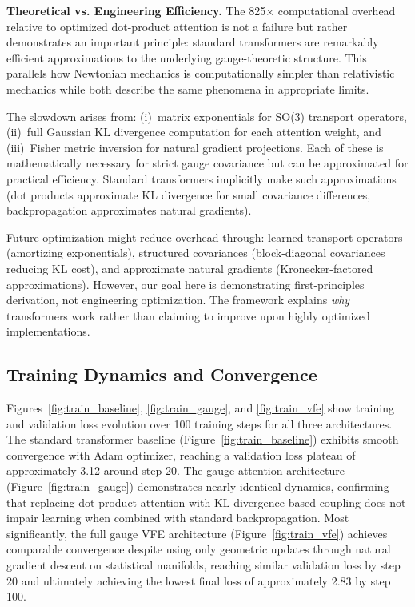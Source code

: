 \documentclass[11pt]{article}
\begin{document}
\textbf{Theoretical vs. Engineering Efficiency.} The 825× computational overhead relative to optimized dot-product attention is not a failure but rather demonstrates an important principle: standard transformers are remarkably efficient approximations to the underlying gauge-theoretic structure. This parallels how Newtonian mechanics is computationally simpler than relativistic mechanics while both describe the same phenomena in appropriate limits.

The slowdown arises from: (i)~matrix exponentials for SO(3) transport operators, (ii)~full Gaussian KL divergence computation for each attention weight, and (iii)~Fisher metric inversion for natural gradient projections. Each of these is mathematically necessary for strict gauge covariance but can be approximated for practical efficiency. Standard transformers implicitly make such approximations (dot products approximate KL divergence for small covariance differences, backpropagation approximates natural gradients).

Future optimization might reduce overhead through: learned transport operators (amortizing exponentials), structured covariances (block-diagonal covariances reducing KL cost), and approximate natural gradients (Kronecker-factored approximations). However, our goal here is demonstrating first-principles derivation, not engineering optimization. The framework explains \emph{why} transformers work rather than claiming to improve upon highly optimized implementations.



\subsection{Training Dynamics and Convergence}

Figures~\ref{fig:train_baseline}, \ref{fig:train_gauge}, and \ref{fig:train_vfe} show training and validation loss evolution over 100 training steps for all three architectures. The standard transformer baseline (Figure~\ref{fig:train_baseline}) exhibits smooth convergence with Adam optimizer, reaching a validation loss plateau of approximately 3.12 around step 20. The gauge attention architecture (Figure~\ref{fig:train_gauge}) demonstrates nearly identical dynamics, confirming that replacing dot-product attention with KL divergence-based coupling does not impair learning when combined with standard backpropagation. Most significantly, the full gauge VFE architecture (Figure~\ref{fig:train_vfe}) achieves comparable convergence despite using only geometric updates through natural gradient descent on statistical manifolds, reaching similar validation loss by step 20 and ultimately achieving the lowest final loss of approximately 2.83 by step 100.
\end{document}
